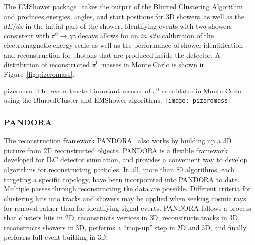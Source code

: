 The EMShower package~\cite{emshowerpackage} takes the output of the
Blurred Clustering Algorithm and
produces energies, angles, and start positions for 3D showers, as
well as the $dE/dx$ in the initial part of the shower.  Identifying
events with two showers consistent with $\pi^0\rightarrow\gamma\gamma$
decays allows for an \textit{in situ} calibration of the electromagnetic
energy scale as well as the performance of shower identification and
reconstruction for photons that are produced inside the detector.  A
distribution of reconstructed $\pi^0$ masses in Monte Carlo is shown
in Figure~\ref{fig:pizeromass}.

\begin{cdrfigure}{pizeromass}{The reconstructed invariant masses of $\pi^0$ candidates in
  Monte Carlo using the BlurredCluster and EMShower algorithms.}
\texttt{[image: pizeromass]}
\end{cdrfigure}

\subsubsection{PANDORA}

The reconstruction framework PANDORA~\cite{Marshall:2015rfa} also works by
building up a 3D picture from 2D
reconstructed objects.  PANDORA is a flexible framework developed for
ILC detector simulation, and provides a convenient way to develop
algorithms for reconstructing particles.  In all, more than 80
algorithms, each targeting a specific topology, have been incorporated
into PANDORA to date.  Multiple passes through reconstructing the data
are possible.  Different criteria for clustering hits into tracks and
showers may be applied when seeking cosmic rays for removal rather than for
identifying signal events.  PANDORA follows a process that clusters hits in 2D,
reconstructs vertices in 3D, reconstructs tracks in 3D,
reconstructs showers in 3D, performs a ``mop-up'' step in 2D and 3D, and finally performs
full event-building in 3D.


